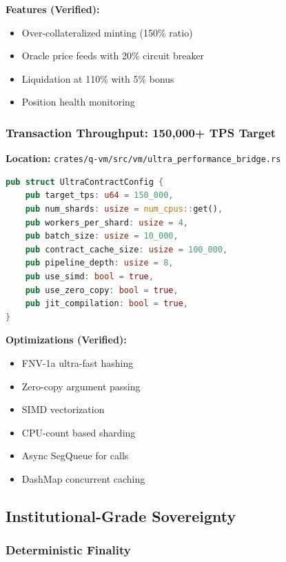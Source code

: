 \documentclass[11pt,a4paper]{article}
\begin{document}
\textbf{Features (Verified):}
\begin{itemize}
    \item Over-collateralized minting (150\% ratio)
    \item Oracle price feeds with 20\% circuit breaker
    \item Liquidation at 110\% with 5\% bonus
    \item Position health monitoring
\end{itemize}

\subsubsection{Transaction Throughput: 150,000+ TPS Target}

\textbf{Location:} \texttt{crates/q-vm/src/vm/ultra\_performance\_bridge.rs}

\begin{lstlisting}[language=Rust,caption={Ultra-Performance Configuration}]
pub struct UltraContractConfig {
    pub target_tps: u64 = 150_000,
    pub num_shards: usize = num_cpus::get(),
    pub workers_per_shard: usize = 4,
    pub batch_size: usize = 10_000,
    pub contract_cache_size: usize = 100_000,
    pub pipeline_depth: usize = 8,
    pub use_simd: bool = true,
    pub use_zero_copy: bool = true,
    pub jit_compilation: bool = true,
}
\end{lstlisting}

\textbf{Optimizations (Verified):}
\begin{itemize}
    \item FNV-1a ultra-fast hashing
    \item Zero-copy argument passing
    \item SIMD vectorization
    \item CPU-count based sharding
    \item Async SegQueue for calls
    \item DashMap concurrent caching
\end{itemize}

\subsection{Institutional-Grade Sovereignty}

\subsubsection{Deterministic Finality}
\end{document}
